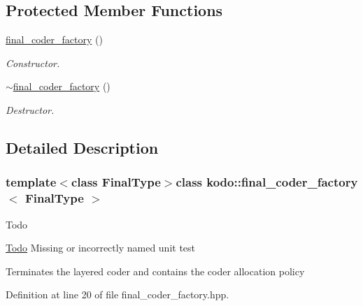 \subsection*{Protected Member Functions}
\begin{DoxyCompactItemize}
\item 
\hypertarget{classkodo_1_1final__coder__factory_abcaa0348dfa85ed45f8bc582ef2f099e}{\hyperlink{classkodo_1_1final__coder__factory_abcaa0348dfa85ed45f8bc582ef2f099e}{final\-\_\-coder\-\_\-factory} ()}\label{classkodo_1_1final__coder__factory_abcaa0348dfa85ed45f8bc582ef2f099e}

\begin{DoxyCompactList}\small\item\em Constructor. \end{DoxyCompactList}\item 
\hypertarget{classkodo_1_1final__coder__factory_aeafc9b3f785880744875723331f91465}{\hyperlink{classkodo_1_1final__coder__factory_aeafc9b3f785880744875723331f91465}{$\sim$final\-\_\-coder\-\_\-factory} ()}\label{classkodo_1_1final__coder__factory_aeafc9b3f785880744875723331f91465}

\begin{DoxyCompactList}\small\item\em Destructor. \end{DoxyCompactList}\end{DoxyCompactItemize}


\subsection{Detailed Description}
\subsubsection*{template$<$class Final\-Type$>$class kodo\-::final\-\_\-coder\-\_\-factory$<$ Final\-Type $>$}

\begin{DoxyRefDesc}{Todo}
\item[\hyperlink{todo__todo000016}{Todo}]Missing or incorrectly named unit test

Terminates the layered coder and contains the coder allocation policy \end{DoxyRefDesc}


Definition at line 20 of file final\-\_\-coder\-\_\-factory.\-hpp.



